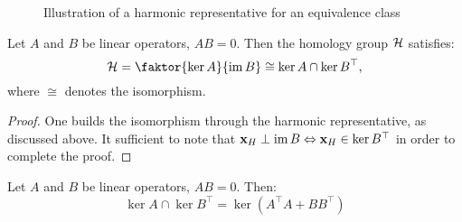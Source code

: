 \begin{figure}[hbtp]
      \centering
            
            \caption{Illustration of a harmonic representative for an equivalence class}
\end{figure}

\begin{theorem}\label{thm:two_kernels}
      Let \( A \) and \( B \) be linear operators, \( A B = 0 \). Then the homology group \( \mathcal{H} \) satisfies:
      \begin{equation}
            \mc H = \faktor{\ker A }{\im B } \cong \ker A \cap \ker B^\top,
      \end{equation}
      where \( \cong \) denotes the isomorphism.
\end{theorem}

\begin{proof}
      One builds the isomorphism through the harmonic representative, as discussed above. It sufficient to note that \( \mathbf{x}_H \perp \operatorname{im} B \Leftrightarrow \mathbf{x}_H \in \ker B^\top \) in order to complete the proof.
\end{proof}

\begin{lemma}\label{lemma:hodge_kernels}
      Let \( A \) and \( B \) be linear operators, \( A B = 0 \). Then:
      \begin{equation}
            \ker A \cap \ker B^\top = \ker \left( A^\top A + B B^\top \right)
      \end{equation}
      \vspace{-\baselineskip}
\end{lemma}

